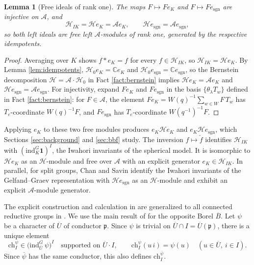 \documentclass[12pt]{article}
\numberwithin{equation}{section}
\newtheorem{lemma}[theorem]{Lemma}
\theoremstyle{definition}
\theoremstyle{remark}
\theoremstyle{plain}
\begin{document}
\begin{lemma}[Free ideals of rank one]\label{lem:HIK}
The maps $F \mapsto Fe_K$ and $F \mapsto Fe_{\mathrm{sgn}}$ are injective on $\mathcal{A}$, and
$$\mathcal{H}_{IK} = \mathcal{H}e_K = \mathcal{A}e_K, \qquad \mathcal{H}e_{\mathrm{sgn}} = \mathcal{A}e_{\mathrm{sgn}},$$
so both left ideals are free left $\mathcal{A}$-modules of rank one, generated by the respective idempotents.
\end{lemma}
\begin{proof}
Averaging over $K$ shows $f * e_K = f$ for every $f \in \mathcal{H}_{IK}$, so $\mathcal{H}_{IK} = \mathcal{H}e_K$. By Lemma \ref{lem:idempotents}, $\mathcal{H}_0e_K = \mathbb{C}e_K$ and $\mathcal{H}_0e_{\mathrm{sgn}} = \mathbb{C}e_{\mathrm{sgn}}$, so the Bernstein decomposition $\mathcal{H} = \mathcal{A}\cdot\mathcal{H}_0$ in Fact \ref{fact:bernstein} implies $\mathcal{H}e_K = \mathcal{A}e_K$ and $\mathcal{H}e_{\mathrm{sgn}} = \mathcal{A}e_{\mathrm{sgn}}$. For injectivity, expand $Fe_K$ and $Fe_{\mathrm{sgn}}$ in the basis $\{\theta_\lambda T_w\}$ defined in Fact \ref{fact:bernstein}: for $F \in \mathcal{A}$, the element $Fe_K = W(q)^{-1}\sum_{w\in W}F\,T_w$ has $T_e$-coordinate $W(q)^{-1}F$, and $Fe_{\mathrm{sgn}}$ has $T_e$-coordinate $W(q^{-1})^{-1}F$.
\end{proof}

Applying $e_K$ to these two free modules produces $e_K\mathcal{H}e_K$ and $e_K\mathcal{H}e_{\mathrm{sgn}}$, which Sections \ref{sec:background} and \ref{sec:bbf} study. The inversion $f \mapsto \check{f}$ identifies $\mathcal{H}_{IK}$ with $(\mathrm{ind}_K^G \mathbf{1})^{I}$, the Iwahori invariants of the spherical model. It is isomorphic to $\mathcal{H}e_{K}$ as an $\mathcal{H}$-module and free over $\mathcal{A}$ with an explicit generator $e_{K} \in \mathcal{H}_{IK}$. In parallel, for split groups, Chan and Savin \cite{CS18} identify the Iwahori invariants of the Gelfand--Graev representation with $\mathcal{H}e_{\mathrm{sgn}}$ as an $\mathcal{H}$-module and exhibit an explicit $\mathcal{A}$-module generator.

The explicit construction and calculation in \cite{CS18} are generalized to all connected reductive groups in \cite{LuoGCS}. We use the main result of \cite{LuoGCS} for the opposite Borel $\overline B$. Let $\psi$ be a character of $\overline{U}$ of conductor $\mathfrak{p}$. Since $\psi$ is trivial on $\overline{U} \cap I = \overline{U}(\mathfrak{p})$, there is a unique element
$$\mathrm{ch}_{I}^{\psi} \in \big(\mathrm{ind}_{\overline{U}}^{G}\,\psi\big)^I \quad\text{supported on } \overline{U}\cdot I, \qquad \mathrm{ch}_{I}^{\psi}(u\, i) = \psi(u) \quad (u\in\overline{U},\ i\in I).$$
Since $\overline{\psi}$ has the same conductor, this also defines $\mathrm{ch}_I^{\overline{\psi}}$.
\end{document}
